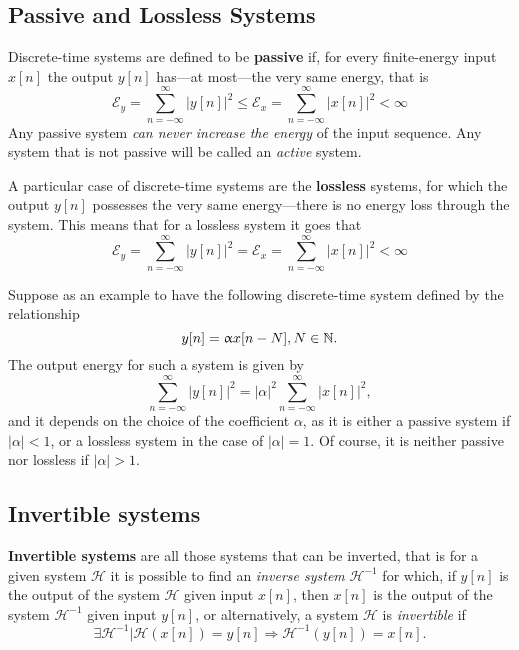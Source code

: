 \documentclass[\documentfontsize, twocolumn]{\classname}
\begin{document}
\subsection{Passive and Lossless Systems}

Discrete-time systems are defined to be \textbf{passive} if, for every finite-energy input $x[n]$ the output $y[n]$ has---at most---the very same energy, that is
\begin{equation}\label{eqn:passiveSystemsDefinition}
    \mathcal E_y = \sum_{n=-\infty}^{\infty} | y[n] |^2
    \leq \mathcal E_x = \sum_{n=-\infty}^{\infty} | x[n] |^2 < \infty
\end{equation}
Any passive system \emph{can never increase the energy} of the input sequence. Any system that is not passive will be called an \emph{active} system. 

A particular case of discrete-time systems are the \textbf{lossless} systems, for which the output $y[n]$ possesses the very same energy---there is no energy loss through the system. This means that for a lossless system it goes that
\begin{equation}\label{eqn:losslessSystemsDefinition}
    \mathcal E_y = \sum_{n=-\infty}^{\infty} | y[n] |^2
    = \mathcal E_x = \sum_{n=-\infty}^{\infty} | x[n] |^2 < \infty
\end{equation}

Suppose as an example to have the following discrete-time system defined by the relationship
\[
    y[n] = \upalpha x[n-N], N\in\mathbb N.
\]
The output energy for such a system is given by
\[
    \sum_{n=-\infty}^{\infty} |y[n]|^2 = |\alpha|^2 \sum_{n=-\infty}^{\infty}|x[n]|^2,
\]
and it depends on the choice of the coefficient $\alpha$, as it is either a passive system if $|\alpha| < 1$, or a lossless system in the case of $|\alpha| = 1$. Of course, it is neither passive nor lossless if $|\alpha| > 1$.

\subsection{Invertible systems}

\textbf{Invertible systems} are all those systems that can be inverted, that is
for a given system $\mathcal H$ it is possible to find an \emph{inverse system}
$\mathcal H^{-1}$ for which, if $y[n]$ is the output of the system $\mathcal H$
given input $x[n]$, then $x[n]$ is the output of the system $\mathcal H^{-1}$
given input $y[n]$, or alternatively, a system $\mathcal H$ is
\emph{invertible} if
\[
	\exists \mathcal H^{-1} | \mathcal {H}(x[n]) = y[n] \Rightarrow \mathcal {H}^{-1}(y[n]) = x[n].
\]
\end{document}
